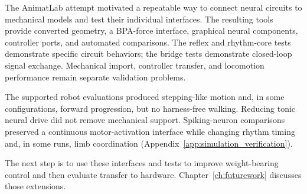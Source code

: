The AnimatLab attempt motivated a repeatable way to connect neural circuits to mechanical models and test their individual interfaces. The resulting tools provide converted geometry, a BPA-force interface, graphical neural components, controller ports, and automated comparisons. The reflex and rhythm-core tests demonstrate specific circuit behaviors; the bridge tests demonstrate closed-loop signal exchange. Mechanical import, controller transfer, and locomotion performance remain separate validation problems.

The supported robot evaluations produced stepping-like motion and, in some configurations, forward progression, but no harness-free walking. Reducing tonic neural drive did not remove mechanical support. Spiking-neuron comparisons preserved a continuous motor-activation interface while changing rhythm timing and, in some runs, limb coordination (Appendix~\ref{app:simulation_verification}).

The next step is to use these interfaces and tests to improve weight-bearing control and then evaluate transfer to hardware. Chapter~\ref{ch:futurework} discusses those extensions. 

